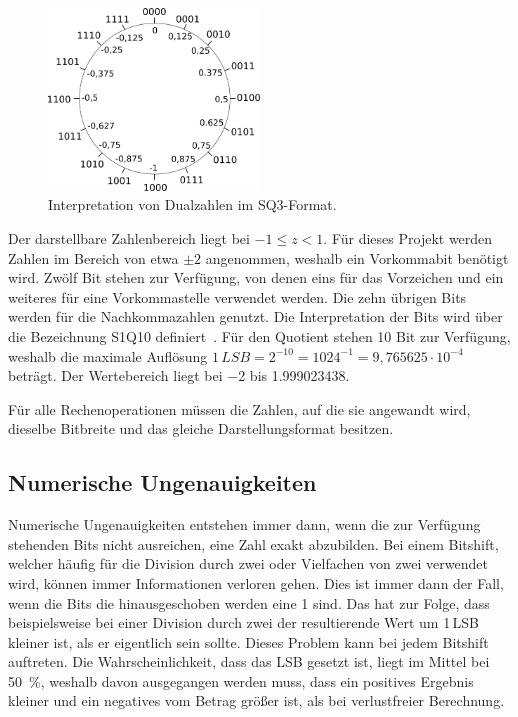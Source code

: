 \begin{figure}[ht!]
 \centering
 \includegraphics[width=0.5\textwidth]{img/SQ-Kreis.png}
 \caption{Interpretation von Dualzahlen im SQ3-Format.}
 \label{pic:SQKreis}
\end{figure}


Der darstellbare Zahlenbereich liegt bei $-1\leq z < 1$. Für dieses Projekt werden Zahlen im Bereich von etwa $\pm2$ angenommen, weshalb ein Vorkommabit benötigt wird. 
Zwölf Bit stehen zur Verfügung, von denen eins für das Vorzeichen und ein weiteres für eine Vorkommastelle verwendet werden. Die zehn übrigen Bits werden für die 
Nachkommazahlen genutzt. Die Interpretation der Bits wird über die Bezeichnung S1Q10 definiert~\autocite[82]{reichardt2013lehrbuch}.
Für den Quotient stehen 10 Bit zur Verfügung, weshalb die maximale Auflösung $1\,LSB = 2^{-10} = {1024}^{-1} = 9,765625\cdot10^{-4}$ beträgt.
Der Wertebereich liegt bei \num{-2} bis \num{1,999023438}. 

Für alle Rechenoperationen müssen die Zahlen, auf die sie angewandt wird, dieselbe Bitbreite und das gleiche Darstellungsformat besitzen.

\subsection{Numerische Ungenauigkeiten}\label{sec:NumerischeUngenauigkeiten}
Numerische Ungenauigkeiten entstehen immer dann, wenn die zur Verfügung stehenden Bits nicht ausreichen, eine Zahl exakt abzubilden. 
Bei einem Bitshift, welcher häufig für die Division durch zwei oder Vielfachen von zwei verwendet wird, können immer Informationen verloren gehen. Dies ist immer dann der Fall,
wenn die Bits die hinausgeschoben werden eine 1 sind. Das hat zur Folge, dass beispielsweise
bei einer Division durch zwei der resultierende Wert um 1\,LSB kleiner ist, als er eigentlich sein sollte. 
Dieses Problem kann bei jedem Bitshift auftreten. Die Wahrscheinlichkeit, dass das LSB gesetzt ist, liegt im Mittel bei \SI{50}{\percent}, weshalb davon ausgegangen werden muss, dass ein 
positives Ergebnis kleiner und ein negatives vom Betrag größer ist, als bei verlustfreier Berechnung. 
